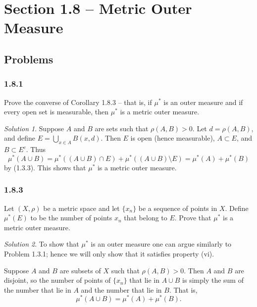 \documentclass{report}
\theoremstyle{remark}
\newtheorem*{solution}{Solution}
\begin{document}
\section*{Section 1.8 -- Metric Outer Measure}

\subsection*{Problems}

\subsubsection*{1.8.1}
Prove the converse of Corollary 1.8.3 -- that is, if $\mu^*$ is an outer measure and if every open set is measurable, then $\mu^*$ is a metric outer measure.

\begin{solution}
  Suppose $A$ and $B$ are sets such that $\rho(A,B) > 0$. Let $d = \rho(A,B)$, and define $E = \bigcup_{x \in A} B(x,d)$. Then $E$ is open (hence measurable), $A \subset E$, and $B \subset E^c$. Thus
  \begin{equation*}
    \mu^*(A \cup B) = \mu^*((A \cup B) \cap E) + \mu^*((A \cup B) \setminus E) = \mu^*(A) + \mu^*(B)
  \end{equation*}
  by (1.3.3). This shows that $\mu^*$ is a metric outer measure.
\end{solution}

\subsubsection*{1.8.3}
Let $(X, \rho)$ be a metric space and let $\{x_n\}$ be a sequence of points in $X$. Define $\mu^*(E)$ to be the number of points $x_n$ that belong to $E$. Prove that $\mu^*$ is a metric outer measure.

\begin{solution}
  To show that $\mu^*$ is an outer measure one can argue similarly to Problem 1.3.1; hence we will only show that it satisfies property (vi).

  Suppose $A$ and $B$ are subsets of $X$ such that $\rho(A,B) > 0$. Then $A$ and $B$ are disjoint, so the number of points of $\{x_n\}$ that lie in $A \cup B$ is simply the sum of the number that lie in $A$ and the number that lie in $B$. That is,
  \begin{equation*}
    \mu^*(A \cup B) = \mu^*(A) + \mu^*(B).
  \end{equation*}
\end{solution}
\end{document}
